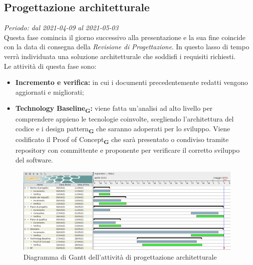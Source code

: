 \subsection{Progettazione architetturale}
\textit{Periodo: dal 2021-04-09 al 2021-05-03}\\
Questa fase comincia il giorno successivo alla presentazione e la sua fine coincide con la data di consegna della \textit{Revisione di Progettazione}. In questo lasso di tempo verrà individuata una soluzione architetturale che soddisfi i requisiti richiesti.\\
Le attività di questa fase sono:
\begin {itemize}
\item \textbf{Incremento e verifica:} in cui i documenti precedentemente redatti vengono aggiornati e migliorati;
\item \textbf{Technology Baseline\textsubscript{\textbf{G}}:} viene fatta un'analisi ad alto livello per comprendere appieno le tecnologie coinvolte, scegliendo l'architettura del codice e i design pattern\textsubscript{\textbf{G}} che saranno adoperati per lo sviluppo. Viene codificato il Proof of Concept\textsubscript{\textbf{G}} che sarà presentato o condiviso tramite repository con committente e proponente per verificare il corretto sviluppo del software.
\end {itemize}
\begin{figure}[!ht]
    \caption{Diagramma di Gantt dell'attività di progettazione architetturale}
    \vspace{5px}
    \includegraphics[scale=0.3]{../../../Images/Diagrammi/Gantt/progettArchitetturale_v2.png}
    \centering
\end{figure}

